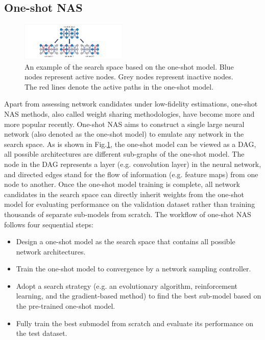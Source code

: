 \documentclass[journal]{IEEEtran}
\begin{document}
\subsection{One-shot NAS}

\begin{figure}[H]
\centering %
\includegraphics[width=0.45\textwidth]{4.pdf} %
\caption{An example of the search space based on the one-shot model. Blue nodes represent active nodes. Grey nodes represent inactive nodes. The red lines denote the active paths in the one-shot model.} %
\label{Fig_4}
\end{figure}

Apart from assessing network candidates under low-fidelity estimations, one-shot NAS methods, also called weight sharing methodologies, have become more and more popular recently. One-shot NAS aims to construct a single large neural network (also denoted as the one-shot model) to emulate any network in the search space. As is shown in Fig.\ref{Fig_4}, the one-shot model can be viewed as a DAG, all possible architectures are different sub-graphs of the one-shot model. The node in the DAG represents a layer (e.g. convolution layer) in the neural network, and directed edges stand for the flow of information (e.g. feature maps) from one node to another. Once the one-shot model training is complete, all network candidates in the search space can directly inherit weights from the one-shot model for evaluating performance on the validation dataset rather than training thousands of separate sub-models from scratch. The workflow of one-shot NAS follows four sequential steps:

\begin{itemize}

\item Design a one-shot model as the search space that contains all possible network architectures. 

\item Train the one-shot model to convergence by a network sampling controller. 

\item Adopt a search strategy (e.g. an evolutionary algorithm, reinforcement learning, and the gradient-based method) to find the best sub-model based on the pre-trained one-shot model. 

\item Fully train the best submodel from scratch and evaluate its performance on the test dataset.

\end{itemize}
\end{document}
